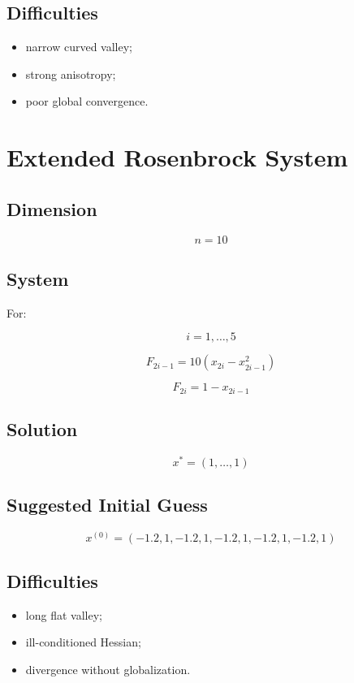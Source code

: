\documentclass[11pt,a4paper]{article}
\begin{document}
\subsection*{Difficulties}

\begin{itemize}
  \item narrow curved valley;
  \item strong anisotropy;
  \item poor global convergence.
\end{itemize}

\section{Extended Rosenbrock System}

\subsection*{Dimension}

\[
n=10
\]

\subsection*{System}

For:

\[
i=1,\dots,5
\]

\[
F_{2i-1}=10(x_{2i}-x_{2i-1}^2)
\]

\[
F_{2i}=1-x_{2i-1}
\]

\subsection*{Solution}

\[
x^*=(1,\dots,1)
\]

\subsection*{Suggested Initial Guess}

\[
x^{(0)}=(-1.2,1,-1.2,1,-1.2,1,-1.2,1,-1.2,1)
\]

\subsection*{Difficulties}

\begin{itemize}
  \item long flat valley;
  \item ill-conditioned Hessian;
  \item divergence without globalization.
\end{itemize}
\end{document}
